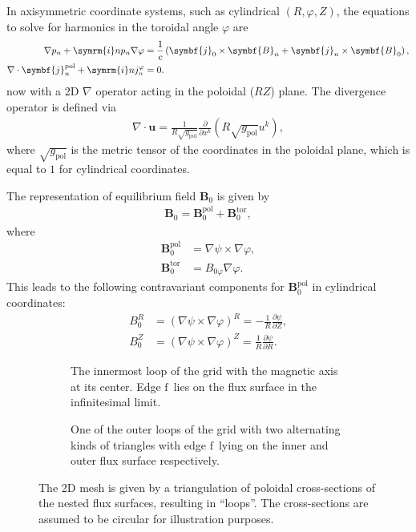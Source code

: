 \documentclass[a4paper, 10pt, english]{article}
\let\temp\vartheta
\let\vartheta\theta
\let\theta\temp
\let\temp\varphi
\let\varphi\phi
\let\phi\temp
\let\vec\symbf
\newcommand*\im{\ensuremath{\symrm{i}}}  %
\newcommand*\pd[2][]{\ensuremath{\frac{\partial #1}{\partial #2}}}  %
\newcommand*\pol{\ensuremath{\textrm{pol}}}  %
\newcommand*\tor{\ensuremath{\textrm{tor}}}  %
\newcommand*\fs{\ensuremath{\textrm{f}}}  %
\begin{document}
In axisymmetric coordinate systems, such as cylindrical $(R, \phi, Z)$, the equations to solve for harmonics in the toroidal angle $\phi$ are
\begin{align}
  \nabla p_{n} + \im n p_{n} \nabla \phi &= \frac{1}{c} \left( \vec{j}_{0} \times \vec{B}_{n} + \vec{j}_{n} \times \vec{B}_{0} \right), \label{eq:mhd-phi} \\
  \nabla \cdot \vec{j}_{n}^{\pol}+ \im n j_{n}^{\phi} &= 0. \label{eq:divfree-phi}
\end{align}
now with a 2D $\nabla$ operator acting in the poloidal ($RZ$) plane. The divergence operator is defined via
\begin{gather*}
  \nabla \cdot \vec{u} = \frac{1}{R \sqrt{g_{\pol}}} \pd{x^{k}} (R \sqrt{g_{\pol}} u^{k}),
\end{gather*}
where $\sqrt{g_{\pol}}$ is the metric tensor of the coordinates in the poloidal plane, which is equal to $1$ for cylindrical coordinates.

The representation of equilibrium field $\vec{B}_{0}$ is given by
\begin{gather}
  \vec{B}_{0} = \vec{B}_{0}^{\pol} + \vec{B}_{0}^{\tor},
\end{gather}
where 
\begin{align}
  \vec{B}_{0}^{\pol} &= \nabla \psi \times \nabla \phi, \\
  \vec{B}_{0}^{\tor} &= B_{0 \phi} \nabla \phi.
\end{align}
This leads to the following contravariant components for $\vec{B}_{0}^{\pol}$ in cylindrical coordinates:
\begin{align}
  B_{0}^{R} &= (\nabla \psi \times \nabla \phi)^{R} = -\frac{1}{R} \pd[\psi]{Z}, \\
  B_{0}^{Z} &= (\nabla \psi \times \nabla \phi)^{Z} = \frac{1}{R} \pd[\psi]{R}.
\end{align}

\begin{figure}
  \centering
  \begin{subfigure}[b]{0.33\textwidth}
    \centering
    
    \caption{The innermost loop of the grid with the magnetic axis at its center. Edge \fs\ lies on the flux surface in the infinitesimal limit.}
    \label{fig:grid0}
  \end{subfigure}
  \quad
  \begin{subfigure}[b]{0.5\textwidth}
    \centering
    
    \caption{One of the outer loops of the grid with two alternating kinds of triangles with edge \fs\ lying on the inner and outer flux surface respectively.}
    \label{fig:grid1}
  \end{subfigure}
  \caption{The 2D mesh is given by a triangulation of poloidal cross-sections of the nested flux surfaces, resulting in \enquote{loops}. The cross-sections are assumed to be circular for illustration purposes.}
  \label{fig:grid}
\end{figure}
\end{document}
